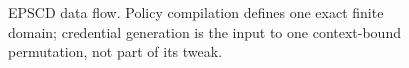\begin{figure}[t]
\centering
\small
\setlength{\tabcolsep}{5pt}
\caption{EPSCD data flow. Policy compilation defines one exact finite domain; credential generation is the input to one context-bound permutation, not part of its tweak.}
\label{fig:pipeline}
\end{figure}
